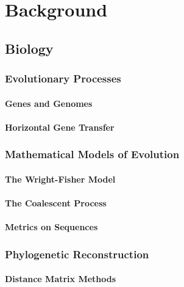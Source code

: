 \chapter{Background}
\label{ch:background}

\section{Biology}

\subsection{Evolutionary Processes}

\subsubsection{Genes and Genomes}

\subsubsection{Horizontal Gene Transfer}

\subsection{Mathematical Models of Evolution}
\label{background:ss:evolutionary_models}

\subsubsection{The Wright-Fisher Model}

\subsubsection{The Coalescent Process}
\label{background:sss:coalescent}

\subsubsection{Metrics on Sequences}

\subsection{Phylogenetic Reconstruction}

\subsubsection{Distance Matrix Methods}

